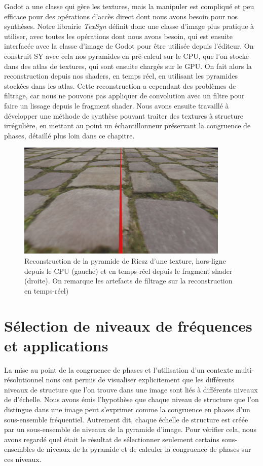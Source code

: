 Godot a une classe qui gère les textures, mais la manipuler est compliqué et peu efficace pour des opérations d'accès direct dont nous avons besoin pour nos synthèses. Notre librairie \textit{TexSyn} définit donc une classe d'image plus pratique à utiliser, avec toutes les opérations dont nous avons besoin, qui est ensuite interfacée avec la classe d'image de Godot pour être utilisée depuis l'éditeur. On construit SY avec cela nos pyramides en pré-calcul sur le CPU, que l'on stocke dans des atlas de textures, qui sont ensuite chargés sur le GPU. On fait alors la reconstruction depuis nos shaders, en temps réel, en utilisant les pyramides stockées dans les atlas. Cette reconstruction a cependant des problèmes de filtrage, car nous ne pouvons pas appliquer de convolution avec un filtre pour faire un lissage depuis le fragment shader. Nous avons ensuite travaillé à développer une méthode de synthèse pouvant traiter des textures à structure irrégulière, en mettant au point un échantillonneur préservant la congruence de phases, détaillé plus loin dans ce chapitre.

\begin{figure}
    \centering
    \includegraphics[width=0.9\textwidth]{contenu/resources/images/reconstruction_cpu_vs_gpu}
    \caption[Reconstruction de texture dans \textit{TexSyn}]{Reconstruction de la pyramide de Riesz d'une texture, hors-ligne depuis le CPU (gauche) et en temps-réel depuis le fragment shader (droite). On remarque les artefacts de filtrage sur la reconstruction en temps-réel)}
    \label{fig:texsyn-reconstruction}
\end{figure}


\section{Sélection de niveaux de fréquences et applications}

La mise au point de la congruence de phases et l'utilisation d'un contexte multi-résolutionnel nous ont permis de visualiser explicitement que les différents niveaux de structure que l'on trouve dans une image sont liés à différents niveaux de d'échelle. Nous avons émis l'hypothèse que chaque niveau de structure que l'on distingue dans une image peut s'exprimer comme la congruence en phases d'un sous-ensemble fréquentiel. Autrement dit, chaque échelle de structure est créée par un sous-ensemble de niveaux de la pyramide d'image. Pour vérifier cela, nous avons regardé quel était le résultat de sélectionner seulement certains sous-ensembles de niveaux de la pyramide et de calculer la congruence de phases sur ces niveaux.

